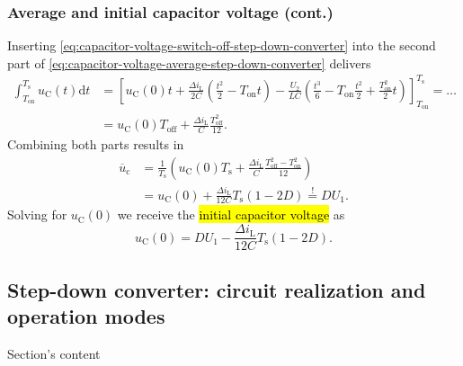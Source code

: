 \begin{frame}
    \frametitle{Average and initial capacitor voltage (cont.)}
     Inserting \eqref{eq:capacitor-voltage-switch-off-step-down-converter} into the second part of \eqref{eq:capacitor-voltage-average-step-down-converter} delivers
    \begin{equation}
        \begin{split}
            \int_{T_\mathrm{on}}^{T_\mathrm{s}} u_\mathrm{C}(t) \mathrm{d}t &= \left[u_\mathrm{C}(0)t +  \frac{\Delta i_\mathrm{L}}{2C}(\frac{t^2}{2} - T_\mathrm{on}t) - \frac{U_2}{LC}(\frac{t^3}{6} - T_\mathrm{on}\frac{t^2}{2} + \frac{T_\mathrm{on}^2}{2}t)  \right]_{T_\mathrm{on}}^{T_\mathrm{s}} =\ldots \\ &= u_\mathrm{C}(0) T_\mathrm{off} + \frac{\Delta i_\mathrm{L}}{C}\frac{T_\mathrm{off}^2}{12}.
        \end{split}
    \end{equation}
    Combining both parts results in
    \begin{equation}
    \begin{split}
        \overline{u}_\mathrm{c} &= \frac{1}{T_\mathrm{s}}\left(u_\mathrm{C}(0)T_\mathrm{s} + \frac{\Delta i_\mathrm{L}}{C}\frac{T_\mathrm{off}^2-T_\mathrm{on}^2}{12} \right)\\
                                & = u_\mathrm{C}(0) + \frac{\Delta i_\mathrm{L}}{12C}T_\mathrm{s}(1-2D) \stackrel{!}{=} D U_1.
        \end{split}
    \end{equation}
    Solving for $u_\mathrm{C}(0)$ we receive the \hl{initial capacitor voltage} as
    \begin{equation}
        u_\mathrm{C}(0) = D U_1 - \frac{\Delta i_\mathrm{L}}{12C}T_\mathrm{s}(1-2D).
    \end{equation}
\end{frame}

\subsection{Step-down converter: circuit realization and operation modes}
\begin{frame}{Section's content}
    \tableofcontents[sectionstyle=show/shaded,subsectionstyle=show/shaded/hide]
\end{frame}

